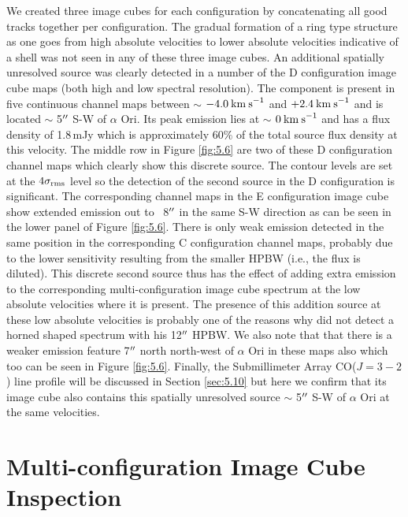 We created three image cubes for each configuration by concatenating all good tracks together per configuration. The gradual formation of a ring type structure as one goes from high absolute velocities to lower absolute velocities indicative of a shell was not seen in any of these three image cubes. An additional spatially unresolved source was clearly detected in a number of the D configuration image cube maps (both high and low spectral resolution). The component is present in five continuous channel maps between $\sim$ $-4.0\>{\rm km\>s}^{-1}$ and $+2.4\>{\rm km\>s}^{-1}$ and is located $\sim$ 5$^{\prime\prime}$ S-W of $\alpha$ Ori. Its peak emission lies at $\sim$ $0\>{\rm km\>s}^{-1}$ and has a flux density of 1.8\,mJy which is approximately 60$\%$ of the total source flux density at this velocity. The middle row in Figure \ref{fig:5.6} are two of these D configuration channel maps which clearly show this discrete source. The contour levels are set at the $4\sigma _{\rm{rms}}$ level so the detection of the second source in the D configuration is significant. The corresponding channel maps in the E configuration image cube show extended emission out to ~8$^{\prime\prime}$ in the same S-W direction as can be seen in the lower panel of Figure \ref{fig:5.6}. There is only weak emission detected in the same position in the corresponding C configuration channel maps, probably due to the lower sensitivity resulting from the smaller HPBW (i.e., the flux is diluted). This discrete second source thus has the effect of adding extra emission to the corresponding multi-configuration image cube spectrum at the low absolute velocities where it is present. The presence of this addition source at these low absolute velocities is probably one of the reasons why \cite{huggins_1994} did not detect a horned shaped spectrum with his 12$^{\prime\prime}$ HPBW. We also note that that there is a weaker emission feature 7$^{\prime\prime}$ north north-west of $\alpha$ Ori in these maps also which too can be seen in Figure \ref{fig:5.6}. Finally, the Submillimeter Array CO($J=3-2$) line profile will be discussed in Section \ref{sec:5.10} but here we confirm that its image cube also contains this spatially unresolved source $\sim$ 5$^{\prime\prime}$ S-W of $\alpha$ Ori at the same velocities.

\section{Multi-configuration Image Cube Inspection}\label{sec:5.5}

